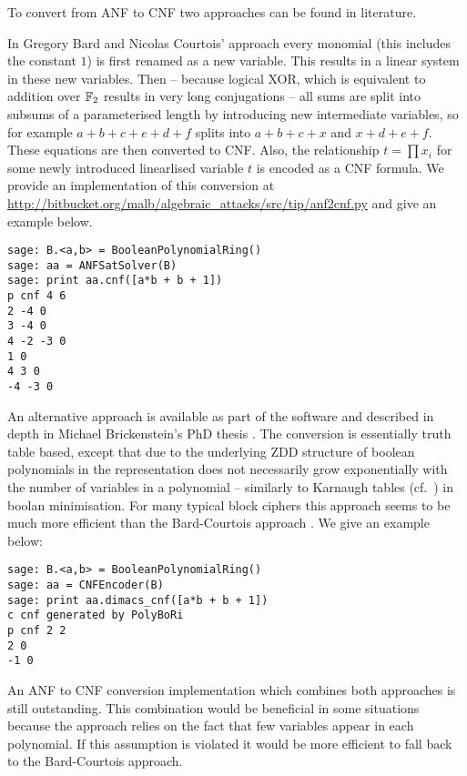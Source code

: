 To convert from ANF to CNF two approaches can be found in literature.

In Gregory Bard and Nicolas Courtois' approach \cite{alg-des} every monomial (this includes the constant $1$) is first renamed as a new variable. This results in a linear system in these new variables. Then -- because logical XOR, which is equivalent to addition over $\mathbb{F}_2$ results in very long conjugations -- all sums are split into subsums of a parameterised length by introducing new intermediate variables, so for example $a + b + c + e + d + f$ splits into $a + b +c + x$ and $x + d + e + f$. These equations are then converted to CNF. Also, the relationship $t = \prod x_i$ for some newly introduced linearlised variable $t$ is encoded as a CNF formula. We provide an implementation of this conversion at \url{http://bitbucket.org/malb/algebraic_attacks/src/tip/anf2cnf.py} and give an example below.  

\begin{lstlisting}
sage: B.<a,b> = BooleanPolynomialRing()
sage: aa = ANFSatSolver(B)
sage: print aa.cnf([a*b + b + 1])
p cnf 4 6
2 -4 0
3 -4 0
4 -2 -3 0
1 0
4 3 0
-4 -3 0
\end{lstlisting}

An alternative approach is available as part of the \PolyBoRi software \cite{polybori} and described in depth in Michael Brickenstein's PhD thesis \cite{brickenstein-phd}. The conversion is essentially truth table based, except that due to the underlying ZDD structure of boolean polynomials in \PolyBoRi the representation does not necessarily grow exponentially with the number of variables in a polynomial -- similarly to Karnaugh tables (cf.\ \cite{digital-systems-2009}) in boolan minimisation. For many typical block ciphers this approach seems to be much more efficient than the Bard-Courtois approach \cite{brickenstein-phd}. We give an example below:

\begin{lstlisting}
sage: B.<a,b> = BooleanPolynomialRing()
sage: aa = CNFEncoder(B)
sage: print aa.dimacs_cnf([a*b + b + 1])
c cnf generated by PolyBoRi
p cnf 2 2
2 0
-1 0
\end{lstlisting}

An ANF to CNF conversion implementation which combines both approaches is still outstanding. This combination would be beneficial in some situations because the \PolyBoRi approach relies on the fact that few variables appear in each polynomial. If this assumption is violated it would be more efficient to fall back to the Bard-Courtois approach.

